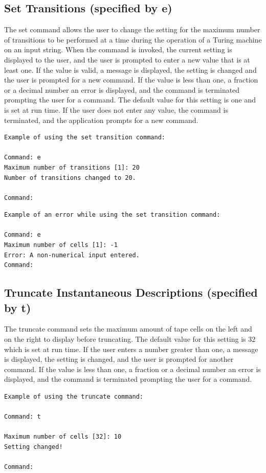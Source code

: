 \documentclass{report}
\begin{document}
\subsection{Set Transitions (specified by e)} 

The set command allows the user to change the setting for the maximum number of transitions to be performed at a time during the operation of a Turing machine on an input string. When the command is invoked, the current setting is displayed to the user, and the user is prompted to enter a new value that is at least one. If the value is valid, a message is displayed, the setting is changed and the user is prompted for a new command. If the value is less than one, a fraction or a decimal number an error is displayed, and the command is terminated prompting the user for a command. The default value for this setting is one and is set at run time. If the user does not enter any value, the command is terminated, and the application prompts for a new command.

\begin{verbatim}
Example of using the set transition command:

Command: e
Maximum number of transitions [1]: 20
Number of transitions changed to 20.
    
Command: 
\end{verbatim}

\begin{verbatim}
Example of an error while using the set transition command:

Command: e
Maximum number of cells [1]: -1
Error: A non-numerical input entered.    
Command: 
\end{verbatim}

\subsection{Truncate Instantaneous Descriptions (specified by t)} 

The truncate command sets the maximum amount of tape cells on the left and on the right to display before truncating. The default value for this setting is 32 which is set at run time. If the user enters a number greater than one, a message is displayed, the setting is changed, and the user is prompted for another command. If the value is less than one, a fraction or a decimal number an error is displayed, and the command is terminated prompting the user for a command. 

\begin{verbatim}
Example of using the truncate command:

Command: t

Maximum number of cells [32]: 10
Setting changed!
    
Command: 
\end{verbatim}
\end{document}
